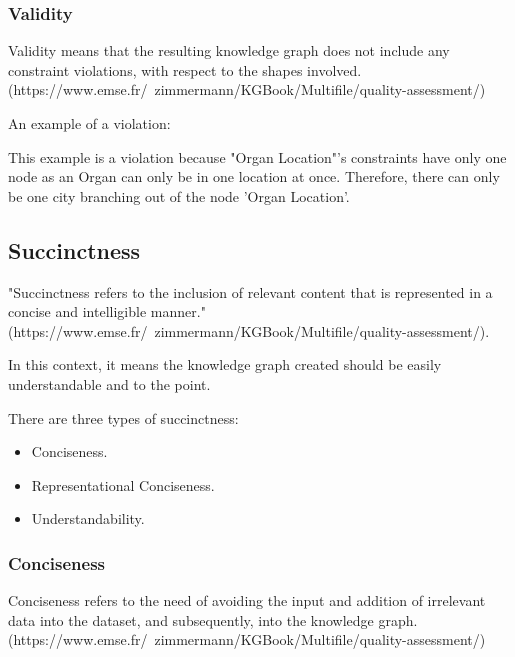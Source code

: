 \subsubsection{Validity}
\hspace{0.5cm} Validity means that the resulting knowledge graph does not include any constraint violations, with respect to the shapes involved. \\
(https://www.emse.fr/~zimmermann/KGBook/Multifile/quality-assessment/) 

An example of a violation:
\begin{center}
\end{center}

This example is a violation because "Organ Location"'s constraints have only one node as an Organ can only be in one location at once. Therefore, there can only be one city branching out of the node 'Organ Location'.

\subsection{Succinctness}
\hspace{0.5cm} "Succinctness refers to the inclusion of relevant content that is represented in a concise and intelligible manner."\\ (https://www.emse.fr/~zimmermann/KGBook/Multifile/quality-assessment/). 

In this context, it means the knowledge graph created should be easily understandable and to the point. 

There are three types of succinctness: 
\begin{itemize}
\item Conciseness.
\item Representational Conciseness.
\item Understandability.
\end{itemize}

\subsubsection{Conciseness}
\hspace{0.5cm} Conciseness refers to the need of avoiding the input and addition of irrelevant data into the dataset, and subsequently, into the knowledge graph. \\
(https://www.emse.fr/~zimmermann/KGBook/Multifile/quality-assessment/)


